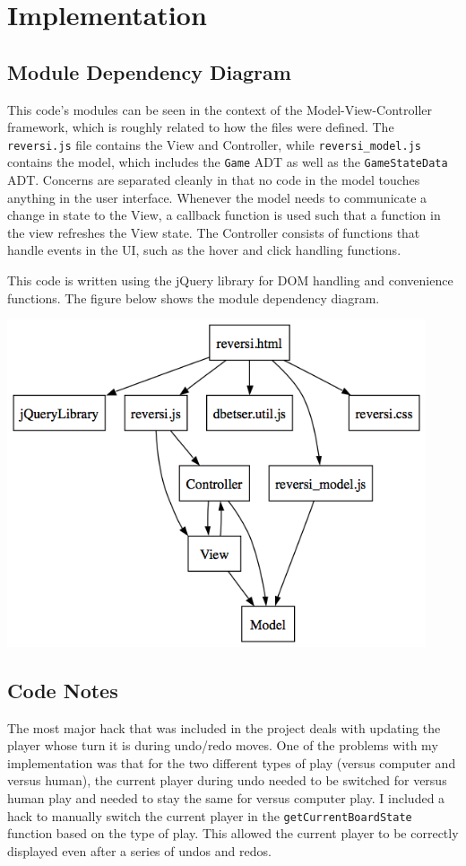 \documentclass[11pt,letterpaper]{article}
\begin{document}
\section{Implementation}

\subsection{Module Dependency Diagram}
This code's modules can be seen in the context of the Model-View-Controller framework, which is roughly related to how the files were defined. The \texttt{reversi.js} file contains the View and Controller, while \texttt{reversi\_model.js} contains the model, which includes the \texttt{Game} ADT as well as the \texttt{GameStateData} ADT. Concerns are separated cleanly in that no code in the model touches anything in the user interface. Whenever the model needs to communicate a change in state to the View, a callback function is used such that a function in the view refreshes the View state. The Controller consists of functions that handle events in the UI, such as the hover and click handling functions. 

This code is written using the jQuery library for DOM handling and convenience functions. The figure below shows the module dependency diagram.

\begin{center}
\includegraphics[width=350pt]{dot/moddepdiagram.png}
\label{fig:ob2} 
\end{center}
\subsection{Code Notes}
The most major hack that was included in the project deals with updating the player whose turn it is during undo/redo moves. One of the problems with my implementation was that for the two different types of play (versus computer and versus human), the current player during undo needed to be switched for versus human play and needed to stay the same for versus computer play. I included a hack to manually switch the current player in the \texttt{getCurrentBoardState} function based on the type of play. This allowed the current player to be correctly displayed even after a series of undos and redos.
\end{document}
